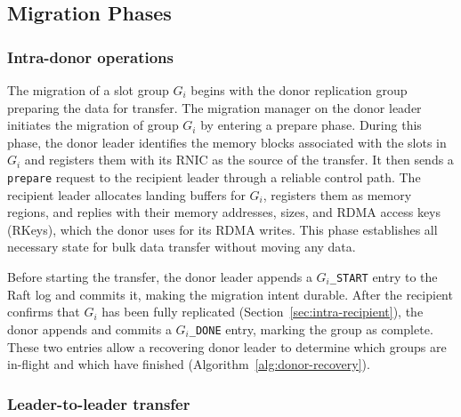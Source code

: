 \subsection{Migration Phases}
\label{sec:migration-phases}

\subsubsection{Intra-donor operations}
\label{sec:intra-donor}

The migration of a slot group $G_i$ begins with the donor replication group preparing the data for transfer.
The migration manager on the donor leader initiates the migration of group $G_i$ by entering a prepare phase.
During this phase, the donor leader identifies the memory blocks associated with the slots in $G_i$ and registers them with its RNIC as the source of the transfer.
It then sends a \texttt{prepare} request to the recipient leader through a reliable control path.
The recipient leader allocates landing buffers for $G_i$, registers them as memory regions, and replies with their memory addresses, sizes, and RDMA access keys (RKeys), which the donor uses for its RDMA writes.
This phase establishes all necessary state for bulk data transfer without moving any data.

Before starting the transfer, the donor leader appends a \texttt{$G_i$\_START} entry to the Raft log and commits it, making the migration intent durable.
After the recipient confirms that $G_i$ has been fully replicated (Section~\ref{sec:intra-recipient}), the donor appends and commits a \texttt{$G_i$\_DONE} entry, marking the group as complete.
These two entries allow a recovering donor leader to determine which groups are in-flight and which have finished (Algorithm~\ref{alg:donor-recovery}).


\subsubsection{Leader-to-leader transfer}
\label{sec:leader-to-leader}

